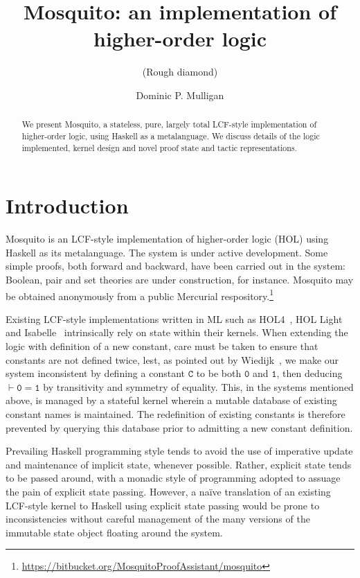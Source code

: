 \documentclass{llncs}
\author{Dominic P. Mulligan}
\title{Mosquito: an implementation of higher-order logic}
\subtitle{(Rough diamond)}
\institute{Computer Laboratory, University of Cambridge}
\newcommand{\mosquito}{Mosquito\xspace}
\begin{document}
\maketitle

\begin{abstract}
We present \mosquito, a stateless, pure, largely total LCF-style implementation of higher-order logic, using Haskell as a metalanguage.
We discuss details of the logic implemented, kernel design and novel proof state and tactic representations.
\end{abstract}

\section{Introduction}
\mosquito is an LCF-style implementation of higher-order logic (HOL) using Haskell as its metalanguage.
The system is under active development.
Some simple proofs, both forward and backward, have been carried out in the system: Boolean, pair and set theories are under construction, for instance.
\mosquito may be obtained anonymously from a public Mercurial respository.\footnote{\url{https://bitbucket.org/MosquitoProofAssistant/mosquito}}

Existing LCF-style implementations written in ML such as HOL4~\cite{gordon:introduction:1993}, HOL Light~\cite{harrison:hol:2009} and Isabelle~\cite{wenzel:isabelle:2008} intrinsically rely on state within their kernels.
When extending the logic with definition of a new constant, care must be taken to ensure that constants are not defined twice, lest, as pointed out by Wiedijk~\cite{wiedijk:stateless:2011}, we make our system inconsistent by defining a constant $\mathtt{C}$ to be both $\mathtt{0}$ and $\mathtt{1}$, then deducing $\vdash \mathtt{0 = 1}$ by transitivity and symmetry of equality.
This, in the systems mentioned above, is managed by a stateful kernel wherein a mutable database of existing constant names is maintained.
The redefinition of existing constants is therefore prevented by querying this database prior to admitting a new constant definition.

Prevailing Haskell programming style tends to avoid the use of imperative update and maintenance of implicit state, whenever possible.
Rather, explicit state tends to be passed around, with a monadic style of programming adopted to assuage the pain of explicit state passing.
However, a na\"ive translation of an existing LCF-style kernel to Haskell using explicit state passing would be prone to inconsistencies without careful management of the many versions of the immutable state object floating around the system.
\end{document}
